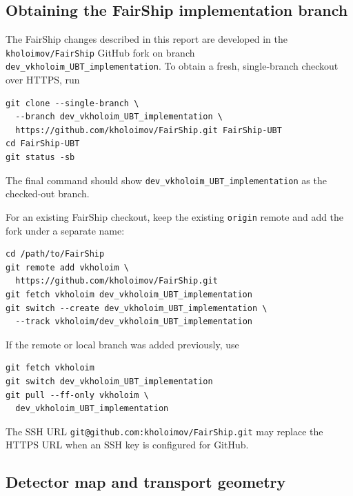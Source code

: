 \subsection{Obtaining the FairShip implementation branch}

\begin{technicaldetails}
The FairShip changes described in this report are developed in the
\texttt{kholoimov/FairShip} GitHub fork on branch
\texttt{dev\_vkholoim\_UBT\_implementation}.  To obtain a fresh,
single-branch checkout over HTTPS, run
\begin{verbatim}
git clone --single-branch \
  --branch dev_vkholoim_UBT_implementation \
  https://github.com/kholoimov/FairShip.git FairShip-UBT
cd FairShip-UBT
git status -sb
\end{verbatim}
The final command should show
\texttt{dev\_vkholoim\_UBT\_implementation} as the checked-out
branch.

For an existing FairShip checkout, keep the existing \texttt{origin} remote
and add the fork under a separate name:
\begin{verbatim}
cd /path/to/FairShip
git remote add vkholoim \
  https://github.com/kholoimov/FairShip.git
git fetch vkholoim dev_vkholoim_UBT_implementation
git switch --create dev_vkholoim_UBT_implementation \
  --track vkholoim/dev_vkholoim_UBT_implementation
\end{verbatim}
If the remote or local branch was added previously, use
\begin{verbatim}
git fetch vkholoim
git switch dev_vkholoim_UBT_implementation
git pull --ff-only vkholoim \
  dev_vkholoim_UBT_implementation
\end{verbatim}
The SSH URL
\texttt{git@github.com:kholoimov/FairShip.git} may replace the HTTPS URL when
an SSH key is configured for GitHub.
\end{technicaldetails}

\subsection{Detector map and transport geometry}

